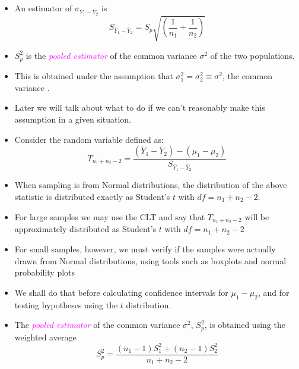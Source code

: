 \documentclass[xcolor=dvipsnames,12pt]{beamer}
\begin{document}
\begin{frame}
\begin{itemize}
\item An estimator of $ \sigma_{\bar{Y}_1 - \bar{Y}_2}$ is
$$
  S_{\bar{Y}_1 - \bar{Y}_2} = S_p \sqrt{\left(\frac{1}{n_1} + \frac{1}{n_2}\right)}
$$
\item $S_p^2$ is the  \textcolor{magenta}{\textit{pooled estimator}} of the common variance
$\sigma^2$ of the two populations.
\item This is obtained under the assumption  that
$\sigma_1^2 = \sigma_2^2 \equiv \sigma^2$, the common variance . 
\item Later we will talk about what to do if we can't reasonably make
this assumption in a given situation.
\end{itemize}
\end{frame}



\begin{frame}
\begin{itemize}
\item Consider the random
variable defined as:
$$
  T_{n_1 + n_2 - 2} = \frac{(\bar{Y}_1 - \bar{Y}_2) - (\mu_1 -
\mu_2)}{S_{\bar{Y}_1 - \bar{Y}_2}}
$$
\item When sampling is from Normal distributions, the distribution of the
above statistic is distributed exactly as Student's $t$ with 
$df=n_1 + n_2 - 2$. 
\item For large samples we may use the CLT and say that $ T_{n_1 + n_2 -
2}$ will be approximately distributed as Student's $t$ with 
$df=n_1 + n_2 - 2$
\item For small samples, however, we must verify if the samples  were 
actually drawn from Normal distributions, using
tools such as boxplots and normal probability plots
\end{itemize}
\end{frame}


\begin{frame}
\begin{itemize}
\item We shall do that before calculating confidence intervals 
for $\mu_1 - \mu_2$, and for testing hypotheses using the $t$ 
distribution. 
\item The \textcolor{magenta}{\textit{pooled estimator}} of the common variance $\sigma^2$,
$S_p^2$, is obtained  using the weighted average
$$
  S_p^2 = \frac{(n_1-1)S_1^2 + (n_2-1)S_2^2}{n_1+n_2 - 2}
$$
\end{itemize}
\end{frame}
\end{document}
